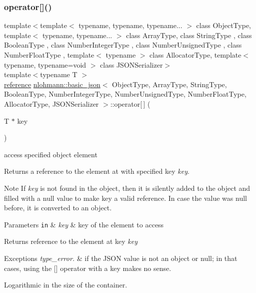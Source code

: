\subsubsection{\texorpdfstring{operator[]()}{operator[]()}\hspace{0.1cm}{\footnotesize\ttfamily [5/8]}}
{\footnotesize\ttfamily template$<$template$<$ typename, typename, typename... $>$ class Object\+Type, template$<$ typename, typename... $>$ class Array\+Type, class String\+Type , class Boolean\+Type , class Number\+Integer\+Type , class Number\+Unsigned\+Type , class Number\+Float\+Type , template$<$ typename $>$ class Allocator\+Type, template$<$ typename, typename=void $>$ class J\+S\+O\+N\+Serializer$>$ \\
template$<$typename T $>$ \\
\hyperlink{classnlohmann_1_1basic__json_ac6a5eddd156c776ac75ff54cfe54a5bc}{reference} \hyperlink{classnlohmann_1_1basic__json}{nlohmann\+::basic\+\_\+json}$<$ Object\+Type, Array\+Type, String\+Type, Boolean\+Type, Number\+Integer\+Type, Number\+Unsigned\+Type, Number\+Float\+Type, Allocator\+Type, J\+S\+O\+N\+Serializer $>$\+::operator\mbox{[}$\,$\mbox{]} (\begin{DoxyParamCaption}\item[{T $\ast$}]{key }\end{DoxyParamCaption})\hspace{0.3cm}{\ttfamily [inline]}}



access specified object element 

Returns a reference to the element at with specified key {\itshape key}.

\begin{DoxyNote}{Note}
If {\itshape key} is not found in the object, then it is silently added to the object and filled with a {\ttfamily null} value to make {\ttfamily key} a valid reference. In case the value was {\ttfamily null} before, it is converted to an object.
\end{DoxyNote}

\begin{DoxyParams}[1]{Parameters}
\mbox{\tt in}  & {\em key} & key of the element to access\\
\hline
\end{DoxyParams}
\begin{DoxyReturn}{Returns}
reference to the element at key {\itshape key} 
\end{DoxyReturn}

\begin{DoxyExceptions}{Exceptions}
{\em type\+\_\+error.} & if the J\+S\+ON value is not an object or null; in that cases, using the \mbox{[}\mbox{]} operator with a key makes no sense.\\
\hline
\end{DoxyExceptions}
Logarithmic in the size of the container.

